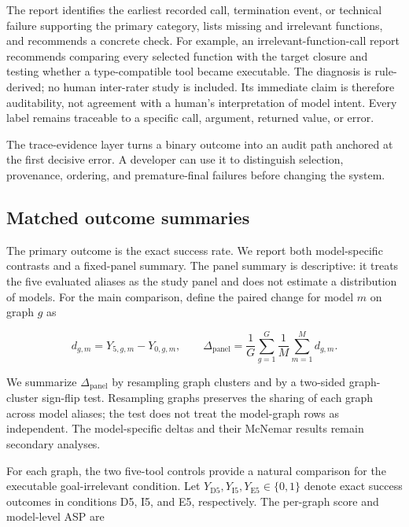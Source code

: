 \documentclass[pdflatex,sn-basic]{sn-jnl}
\begin{document}
The report identifies the earliest recorded call, termination event, or
technical failure supporting the primary category,
lists missing and irrelevant functions, and recommends a concrete check. For
example, an irrelevant-function-call report recommends comparing every selected
function with the target closure and testing whether a type-compatible tool
became executable. The diagnosis is rule-derived; no human inter-rater study is
included. Its immediate claim is therefore auditability, not agreement with a
human's interpretation of model intent. Every label remains traceable to a
specific call, argument, returned value, or error.

The trace-evidence layer turns a binary outcome into an audit path anchored at
the first decisive error. A developer can use it to distinguish selection,
provenance, ordering, and premature-final failures before changing the system.

\subsection{Matched outcome summaries}

The primary outcome is the exact success rate. We report both model-specific
contrasts and a fixed-panel summary. The panel summary is descriptive: it treats
the five evaluated aliases as the study panel and does not estimate a
distribution of models. For the main comparison, define the paired change for
model \(m\) on graph \(g\) as

\begin{equation}
d_{g,m}=Y_{5,g,m}-Y_{0,g,m},
\qquad
\Delta_{\mathrm{panel}}
=\frac{1}{G}\sum_{g=1}^{G}\frac{1}{M}\sum_{m=1}^{M}d_{g,m}.
\label{eq:panel-main}
\end{equation}

We summarize \(\Delta_{\mathrm{panel}}\) by resampling graph clusters and by a
two-sided graph-cluster sign-flip test. Resampling graphs preserves the sharing
of each graph across model aliases; the test does not treat the
\StudyMainPairs{} model-graph rows as independent. The model-specific deltas and
their McNemar results remain secondary analyses.

For each graph, the two five-tool controls provide a natural comparison for the
executable goal-irrelevant condition. Let
\(Y_{\mathrm{D5}},Y_{\mathrm{I5}},Y_{\mathrm{E5}}\in\{0,1\}\) denote exact
success outcomes in conditions D5, I5, and E5, respectively. The per-graph
score and model-level ASP are
\end{document}
